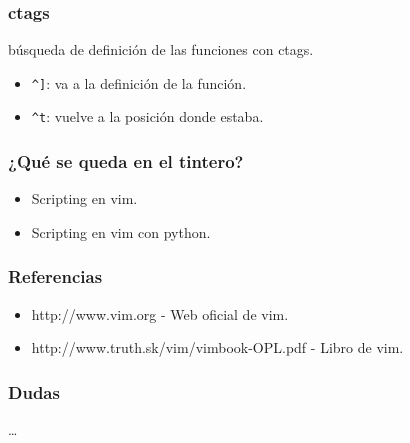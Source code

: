 \documentclass[10pt]{beamer}
\begin{document}
  \begin{frame}[containsverbatim]
    \frametitle{ctags}
    búsqueda de definición de las funciones con ctags.
    \begin{itemize}
      \item \verb+^]+: va a la definición de la función.
      \item \verb+^t+: vuelve a la posición donde estaba.
    \end{itemize}
  \end{frame}

 
  \begin{frame}
    \frametitle{¿Qué se queda en el tintero?}
    \begin{itemize}
      \item Scripting en vim.
      \item Scripting en vim con python.
    \end{itemize}
  \end{frame}

  \begin{frame}
    \frametitle{Referencias}
    \begin{itemize}
      \item \small{http://www.vim.org - Web oficial de vim.}
      \item \small{http://www.truth.sk/vim/vimbook-OPL.pdf - Libro de vim.}
    \end{itemize}
  \end{frame}

  \begin{frame}
    \frametitle{Dudas}
    \dots
  \end{frame}
\end{document}
